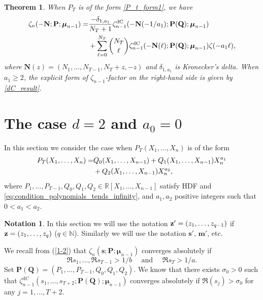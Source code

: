 \documentclass[a4paper,12pt]{article}
\newtheorem{thm}{Theorem}
\theoremstyle{definition}
\newtheorem*{notation}{Notation}
\numberwithin{equation}{section}
\def\N{{\mathbb N}}
\def\z{{\bf z}}
\newcommand{\mub}{\boldsymbol{\mu}}
\newcommand{\dc}{\mathrm{dC}}
\begin{document}
\begin{thm}\label{thm_d=1}
When $P_T$ is of the form \eqref{P_t_form1}, we have
\begin{align}\label{formula_d=1}
\zeta_n(-\mathbf{N};\mathbf{P};\boldsymbol{\mu}_{n-1})
=&\frac{-\delta_{1,a_1}}{N_T+1}\zeta_{n-1}^{\dc}(-\mathbf{N}(-1/a_1);
\mathbf{P(Q)};\boldsymbol{\mu}_{n-1})\notag\\
&+\sum_{\ell=0}^{N_T}\binom{N_T}{\ell}
\zeta_{n-1}^{\dc}(-\mathbf{N}(\ell);
\mathbf{P(Q)};\boldsymbol{\mu}_{n-1})\zeta(-a_1\ell),
\end{align}
where $\mathbf{N}(z)=(N_1,\ldots,N_{T-1},N_T+z,-z)$ and
$\delta_{1,a_1}$ is Kronecker's delta.
When $a_1\geq 2$, the explicit form of $\zeta_{n-1}$-factor 
on the right-hand side is given by \eqref{dC_result}.
\end{thm}

\section{The case \texorpdfstring{$d=2$}{d equal 2} and \texorpdfstring{$a_0=0$}{a0 equal 0}}
\label{section:case_d_equal_2}

In this section we consider the case when $P_T(X_1,\ldots,X_n)$ is of the form
\begin{align}\label{P_t_form2}
P_T(X_1,\ldots,X_n)=&Q_0(X_1,\ldots,X_{n-1})+Q_1(X_1,\ldots,X_{n-1})X_n^{a_1}\notag\\
&+Q_2(X_1,\ldots,X_{n-1})X_n^{a_2},
\end{align}
where
$P_1,\ldots, P_{T-1}, Q_0,Q_1, Q_2\in \mathbb{R}[X_1,\ldots,X_{n-1}]$ satisfy HDF and \eqref{eq:condition_polynomials_tends_infinity}, and $a_1, a_2$  positive integers such that $0<a_1<a_2$.

\begin{notation}
In this section we will use the notation $ \z'=(z_1,\ldots, z_{q-1})$ if $\z=(z_1,\ldots,z_q)$ ($q\in \N$). Similarly we will use the notation $\mathbf{s}'$, $\mathbf{m}'$, etc.
\end{notation}
We recall from (\ref{1-2}) that 
$\zeta_n(\mathbf{s};\mathbf{P};\mub_{n-1})$ converges absolutely if 
$$\Re s_1,\ldots,\Re s_{T-1}> 1/b \quad \text{ and } \quad \Re s_T> 1/a.$$
Set $\mathbf{P(Q)}=(P_1,\ldots,P_{T-1},Q_0,Q_1, Q_2)$. We know that there exists $\sigma_0>0$ such that 
$\zeta_{n-1}^{\dc}(s_1, \ldots, s_{T+2}; \mathbf{P(Q)};\boldsymbol{\mu}_{n-1})$ converges absolutely if $\Re (s_j)>\sigma_0$ for any $j=1,\ldots, T+2.$
\end{document}
